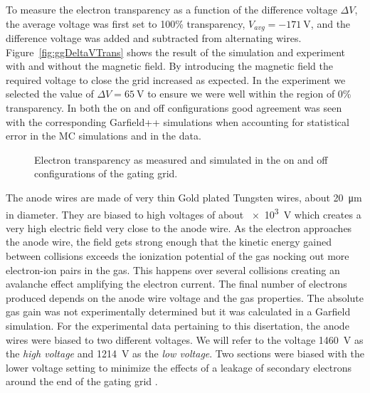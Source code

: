 To measure the electron transparency as a function of the difference voltage $\Delta V$, the average voltage was first set to 100\% transparency, $V_{avg}=\SI{-171}{\volt}$, and the difference voltage was added and subtracted from alternating wires. Figure~\ref{fig:ggDeltaVTrans} shows the result of the simulation and experiment with and without the magnetic field. By introducing the magnetic field the required voltage to close the grid increased as expected. In the experiment we selected the value of $\Delta V = \SI{65}{\volt}$ to ensure we were well within the region of 0\% transparency. In both the on and off configurations good agreement was seen with the corresponding Garfield++ simulations when accounting for statistical error in the MC simulations and in the data.   



\begin{figure}[!htb]%
    \centering
    \qquad
\caption{Electron transparency as measured and simulated in the on and off configurations of the gating grid.}    
\label{fig:ggTrans}
\end{figure}


The anode wires are made of very thin Gold plated Tungsten wires, about \SI{20}{\micro\metre} in diameter. They are biased to high voltages of about  \SI{e3}{\volt} which creates a very high electric field very close to the anode wire. As the electron approaches the anode wire, the field gets strong enough that the kinetic energy gained between collisions exceeds the ionization potential of the gas nocking out more electron-ion pairs in the gas. This happens over several collisions creating an avalanche effect amplifying the electron current.  The final number of electrons produced depends on the anode wire voltage and the gas properties. The absolute gas gain was not experimentally determined but it was calculated in a Garfield simulation. For the experimental data pertaining to this disertation, the anode wires were biased to two different voltages. We will refer to the voltage \SI{1460}{\volt} as the \emph{high voltage} and \SI{1214}{\volt} as the \emph{low voltage}. Two sections were biased with the lower voltage setting to minimize the effects of a leakage of secondary electrons around the end of the gating grid \cite{jon}.


